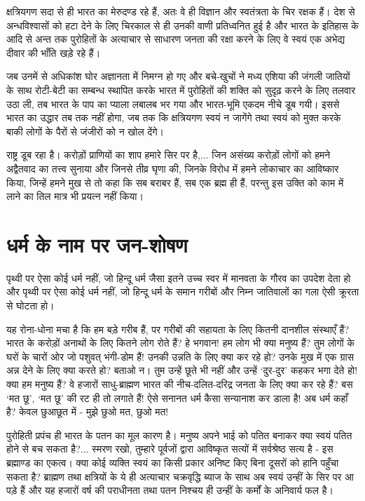 क्षत्रियगण सदा से ही भारत का मेरुदण्ड रहे हैं, अतः वे ही विज्ञान और स्वतंत्रता के चिर रक्षक हैं। देश से अन्धविश्वासों को हटा देने के लिए चिरकाल से ही उनकी वाणी प्रतिध्वनित हुई है और भारत के इतिहास के आदि से अन्त तक पुरोहितों के अत्याचार से साधारण जनता की रक्षा करने के लिए वे स्वयं एक अभेद्य दीवार की भाँति खड़े रहे हैं। 

जब उनमें से अधिकांश घोर अज्ञानता में निमग्न हो गए और बचे-खुचों ने मध्य एशिया की जंगली जातियों के साथ रोटी-बेटी का सम्बन्ध स्थापित करके भारत में पुरोहितों की शक्ति को सुदृढ़ करने के लिए तलवार उठा ली, तब भारत के पाप का प्याला लबालब भर गया और भारत-भूमि एकदम नीचे डूब गयी। इससे भारत का उद्धार तब तक नहीं होगा, जब तक कि क्षत्रियगण स्वयं न जागेंगे तथा स्वयं को मुक्त करके बाकी लोगों के पैरों से जंजीरों को न खोल देंगे। 

राष्ट्र डूब रहा है। करोड़ों प्राणियों का शाप हमारे सिर पर है,... जिन असंख्य करोड़ों लोगों को हमने अद्वैतवाद का तत्त्व सुनाया और जिनसे तीव्र घृणा की, जिनके विरोध में हमने लोकाचार का आविष्कार किया, जिन्हें हमने मुख से तो कहा कि सब बराबर हैं, सब एक ब्रह्म ही हैं, परन्तु इस उक्ति को काम में लाने का तिल मात्र भी प्रयत्न नहीं किया।


\section*{धर्म के नाम पर जन-शोषण}


पृथ्वी पर ऐसा कोई धर्म नहीं, जो हिन्दू धर्म जैसा इतने उच्च स्वर में मानवता के गौरव का उपदेश देता हो और पृथ्वी पर ऐसा कोई धर्म नहीं, जो हिन्दू धर्म के समान गरीबों और निम्न जातिवालों का गला ऐसी क्रूरता से घोटता हो। 

यह रोना-धोना मचा है कि हम बड़े गरीब हैं, पर गरीबों की सहायता के लिए कितनी दानशील संस्थाएँ हैं? भारत के करोड़ों अनाथों के लिए कितने लोग रोते हैं? हे भगवान! हम लोग भी क्या मनुष्य हैं? तुम लोगों के घरों के चारों ओर जो पशुवत् भंगी-डोम हैं! उनकी उन्नति के लिए क्या कर रहे हो? उनके मुख में एक ग्रास अन्न देने के लिए क्या करते हो? बताओ न। तुम उन्हें छूते भी नहीं और उन्हें ‘दुर-दुर’ कहकर भगा देते हो! क्या हम मनुष्य हैं? वे हजारों साधु-ब्राह्मण भारत की नीच-दलित-दरिद्र जनता के लिए क्या कर रहे हैं? बस ‘मत छू’, ‘मत छू’ की रट ही तो लगाते हैं! ऐसे सनानत धर्म कैसा सन्यानाश कर डाला है! अब धर्म कहाँ है? केवल छुआछूत में - मुझे छुओ मत, छुओ मत! 

पुरोहिती प्रपंच ही भारत के पतन का मूल कारण है। मनुष्य अपने भाई को पतित बनाकर क्या स्वयं पतित होने से बच सकता है?... स्मरण रखो, तुम्हारे पूर्वजों द्वारा आविष्कृत सत्यों में सर्वश्रेष्ठ सत्य है - इस ब्रह्माण्ड का एकत्व। क्या कोई व्यक्ति स्वयं का किसी प्रकार अनिष्ट किए बिना दूसरों को हानि पहुँचा सकता है? ब्राह्मण तथा क्षत्रियों के ये ही अत्याचार चक्रवृद्धि ब्याज के साथ अब स्वयं उन्हीं के सिर पर आ पड़े हैं और यह हजारों वर्ष की पराधीनता तथा पतन निश्चय ही उन्हीं के कर्मों के अनिवार्य फल है।


